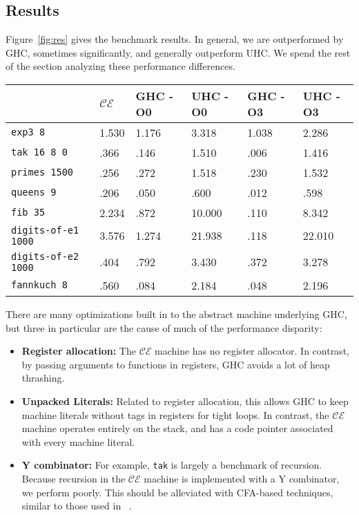 \subsection{Results} \label{sec:res}

Figure~\ref{fig:res} gives the benchmark results.  In general, we are
outperformed by GHC, sometimes significantly, and generally outperform UHC. We
spend the rest of the section analyzing these performance differences.

\begin{figure*}
\centering
\begin{tabularx}{\textwidth}{l | X | X | X | X | X}
& $\mathcal{CE}$ & GHC -O0 & UHC -O0 & GHC -O3 & UHC -O3 \\
\hline
\texttt{exp3 8} & 1.530 & 1.176 & 3.318 & 1.038 & 2.286 \\
\texttt{tak 16 8 0} & .366 & .146 & 1.510 & .006 & 1.416 \\
\texttt{primes 1500} & .256 & .272 & 1.518 & .230 & 1.532 \\
\texttt{queens 9} & .206 & .050 & .600 & .012 & .598 \\
\texttt{fib 35} & 2.234 & .872 & 10.000 & .110 & 8.342 \\
\texttt{digits-of-e1 1000} & 3.576 & 1.274 & 21.938 & .118 & 22.010 \\
\texttt{digits-of-e2 1000} & .404 & .792 & 3.430 & .372 & 3.278 \\
\texttt{fannkuch 8} & .560 & .084 & 2.184 & .048 & 2.196 \\
\end{tabularx}
\caption{Machine Literals Benchmark Results. Measurement is wall clock time,
units are seconds. Times averaged over 5 runs}
\label{fig:res}
\end{figure*}

There are many optimizations built in to the abstract machine underlying GHC,
but three in particular are the cause of much of the performance disparity: 

\begin{itemize}
\item \textbf{Register allocation:} The $\mathcal{CE}$ machine has no register
allocator. In contrast, by passing arguments to functions in registers, GHC
avoids a lot of heap thrashing.
\item \textbf{Unpacked Literals:} Related to register allocation, this allows
GHC to keep machine literals without tags in registers for tight loops. In
contrast, the $\mathcal{CE}$ machine operates entirely on the stack, and has a
code pointer associated with every machine literal. 
\item \textbf{Y combinator:} For example, \texttt{tak} is largely a benchmark of
recursion.  Because recursion in the $\mathcal{CE}$ machine is implemented with
a Y combinator, we perform poorly. This should be alleviated with CFA-based
techniques, similar to those used in ~\cite{rozas1992taming}. 
\end{itemize}

